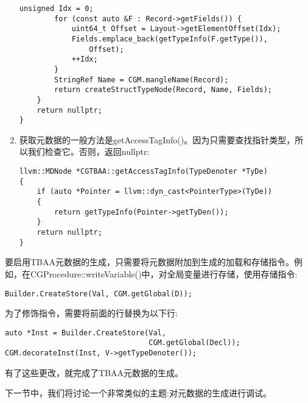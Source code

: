 \begin{enumerate}
\begin{lstlisting}[caption={}]
		unsigned Idx = 0;
		for (const auto &F : Record->getFields()) {
			uint64_t Offset = Layout->getElementOffset(Idx);
			Fields.emplace_back(getTypeInfo(F.getType()), 
				Offset);
			++Idx;
		}
		StringRef Name = CGM.mangleName(Record);
		return createStructTypeNode(Record, Name, Fields);
	}
	return nullptr;
}
\end{lstlisting}

\item 获取元数据的一般方法是getAccessTagInfo()。因为只需要查找指针类型，所以我们检查它。否则，返回nullptr:
\begin{lstlisting}[caption={}]
llvm::MDNode *CGTBAA::getAccessTagInfo(TypeDenoter *TyDe) 
{
	if (auto *Pointer = llvm::dyn_cast<PointerType>(TyDe)) 
	{
		return getTypeInfo(Pointer->getTyDen());
	}
	return nullptr;
}
\end{lstlisting}
\end{enumerate}

要启用TBAA元数据的生成，只需要将元数据附加到生成的加载和存储指令。例如，在CGProced\allowbreak ure::writeVariable()中，对全局变量进行存储，使用存储指令:\par

\begin{lstlisting}[caption={}]
Builder.CreateStore(Val, CGM.getGlobal(D));
\end{lstlisting}

为了修饰指令，需要将前面的行替换为以下行:\par

\begin{lstlisting}[caption={}]
auto *Inst = Builder.CreateStore(Val,
								 CGM.getGlobal(Decl));
CGM.decorateInst(Inst, V->getTypeDenoter());
\end{lstlisting}

有了这些更改，就完成了TBAA元数据的生成。\par

下一节中，我们将讨论一个非常类似的主题:对元数据的生成进行调试。\par








